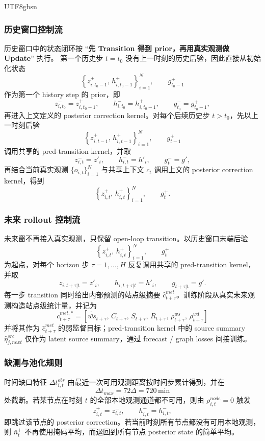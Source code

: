 \documentclass[11pt]{article}
\begin{document}
\begin{CJK}{UTF8}{gbsn}
\subsubsection{历史窗口控制流}
历史窗口中的状态闭环按 ``\textbf{先 Transition 得到 prior，再用真实观测做 Update}'' 执行。
第一个历史步 $t=t_0$ 没有上一时刻的历史后验，因此直接从初始化状态
\[
\left\{z^+_{i,t_0-1},\, h^+_{i,t_0-1}\right\}_{i=1}^N,\qquad g^+_{t_0-1}
\]
作为第一个 history step 的 prior，即
\[
z^-_{i,t_0}=z^+_{i,t_0-1},\qquad h^-_{i,t_0}=h^+_{i,t_0-1},\qquad g^-_{t_0}=g^+_{t_0-1},
\]
再进入上文定义的 posterior correction kernel。对每个后续历史步 $t>t_0$，先以上一时刻后验
\[
\left\{z^+_{i,t-1},\, h^+_{i,t-1}\right\}_{i=1}^N,\qquad g^+_{t-1}
\]
调用共享的 pred-transition kernel，并取
\[
z^-_{i,t}=z'_i,\qquad h^-_{i,t}=h'_i,\qquad g_t^-=g',
\]
再结合当前真实观测 $\{o_{i,t}\}_{i=1}^N$ 与共享上下文 $c_t$ 调用上文的 posterior correction kernel，得到
\[
\left\{z^+_{i,t},\, h^+_{i,t}\right\}_{i=1}^N,\qquad g_t^+.
\]

\subsubsection{未来 rollout 控制流}
未来窗不再接入真实观测，只保留 open-loop transition。以历史窗口末端后验
\[
\left\{z^+_{i,t},\, h^+_{i,t}\right\}_{i=1}^N,\qquad g_t^+
\]
为起点，对每个 horizon 步 $\tau=1,\ldots,H$ 反复调用共享的 pred-transition kernel，并取
\[
z_{i,t+\tau|t}=z'_i,\qquad h_{i,t+\tau|t}=h'_i,\qquad g_{t+\tau|t}=g'.
\]
每一步 transition 同时给出内部预测的站点级摘要 $\hat c^{met}_{t+\tau}$。训练阶段从真实未来观测构造站点级统计量，并记为
\[
c^{met,*}_{t+\tau}=\left[\widetilde{\bar{ws}}_{t+\tau},\, C_{t+\tau},\, S_{t+\tau},\, R_{t+\tau},\, \rho^{ws}_{t+\tau},\, \rho^{wd}_{t+\tau}\right]
\]
并将其作为 $\hat c^{met}_{t+\tau}$ 的弱监督目标；pred-transition kernel 中的
source summary $\hat\eta^{src}_{j,next}$ 仅作为 latent source summary，通过 forecast / graph losses 间接训练。

\subsubsection{缺测与池化规则}
时间缺口特征 $\Delta t^{obs}_{i,t}$ 由最近一次可用观测距离按时间步累计得到，并在
\[
\Delta t_{max}=72\Delta=720\,\mathrm{min}
\]
处截断。若某节点在时刻 $t$ 的全部本地观测通道都不可用，则由 $\rho^{node}_{i,t}=0$ 触发
\[
z^+_{i,t}=z^-_{i,t},\qquad h^+_{i,t}=h^-_{i,t},
\]
即跳过该节点的 posterior correction。若当前时刻所有节点都没有可用本地观测，则
$\bar n_t^+$ 不再使用掩码平均，而退回到所有节点 posterior state 的简单平均。


\end{CJK}
\end{document}
